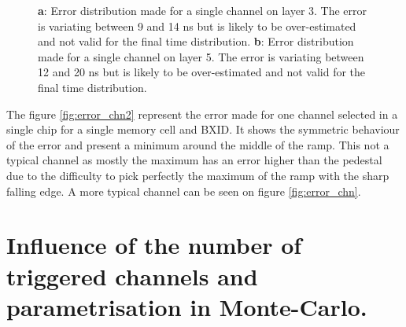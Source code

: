 \documentclass[twoside,a4paper,11pt]{article}
\begin{document}
\begin{appendix}
\begin{figure}[htbp]
	\caption[]{\textbf{a}: Error distribution made for a single channel on layer 3. The error is variating between 9 and 14 ns but is likely to be over-estimated and not valid for the final time distribution. \textbf{b}: Error distribution made for a single channel on layer 5. The error is variating between 12 and 20 ns but is likely to be over-estimated and not valid for the final time distribution.}
	\label{fig:error_calibration}
\end{figure}
The figure \ref{fig:error_chn2} represent the error made for one channel selected in a single chip for a single memory cell and BXID. It shows the symmetric behaviour of the error and present a minimum around the middle of the ramp. This not a typical channel as mostly the maximum has an error higher than the pedestal due to the difficulty to pick perfectly the maximum of the ramp with the sharp falling edge. A more typical channel can be seen on figure \ref{fig:error_chn}.

\newpage
\section{Influence of the number of triggered channels and parametrisation in Monte-Carlo.}
\label{appendix:ped_shift}


\end{appendix}
\end{document}
